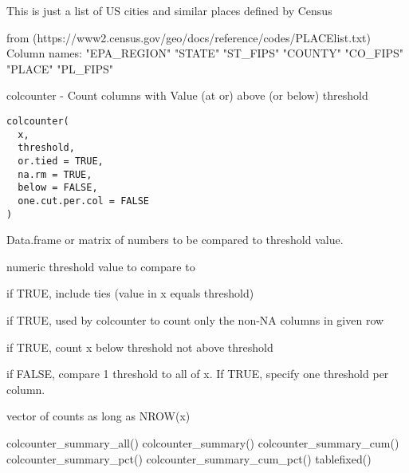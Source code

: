 \documentclass[a4paper]{book}
\begin{document}
%
\begin{Description}\relax
This is just a list of US cities and similar places defined by Census
\end{Description}
%
\begin{Details}\relax
from (https://www2.census.gov/geo/docs/reference/codes/PLACElist.txt)
Column names:  "EPA\_REGION" "STATE" "ST\_FIPS" "COUNTY" "CO\_FIPS" "PLACE" "PL\_FIPS"
\end{Details}
%
\begin{Description}\relax
colcounter - Count columns with Value (at or) above (or below) threshold
\end{Description}
%
\begin{Usage}
\begin{verbatim}
colcounter(
  x,
  threshold,
  or.tied = TRUE,
  na.rm = TRUE,
  below = FALSE,
  one.cut.per.col = FALSE
)
\end{verbatim}
\end{Usage}
%
\begin{Arguments}
\begin{ldescription}
\item[\code{x}] Data.frame or matrix of numbers to be compared to threshold value.

\item[\code{threshold}] numeric threshold value to compare to

\item[\code{or.tied}] if TRUE, include ties (value in x equals threshold)

\item[\code{na.rm}] if TRUE, used by colcounter to count only the non-NA columns in given row

\item[\code{below}] if TRUE, count x below threshold not above threshold

\item[\code{one.cut.per.col}] if FALSE, compare 1 threshold to all of x.
If TRUE, specify one threshold per column.
\end{ldescription}
\end{Arguments}
%
\begin{Value}
vector of counts as long as NROW(x)
\end{Value}
%
\begin{SeeAlso}\relax
colcounter\_summary\_all() colcounter\_summary() colcounter\_summary\_cum() colcounter\_summary\_pct() colcounter\_summary\_cum\_pct() tablefixed()
\end{SeeAlso}
\end{document}
